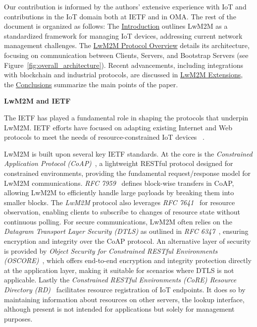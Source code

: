 \documentclass[11pt,sigconf]{iabart}
\begin{document}
Our contribution is informed by the authors' extensive experience with IoT and contributions in the IoT domain both at IETF and in OMA. The rest of the document is organized as follows: The \hyperref[introduction]{Introduction} outlines LwM2M as a standardized framework for managing IoT devices, addressing current network management challenges. The \hyperref[overview]{LwM2M Protocol Overview} details its architecture, focusing on communication between Clients, Servers, and Bootstrap Servers (see Figure~\ref{fig:overall_architecture}). Recent advancements, including integrations with blockchain and industrial protocols, are discussed in \hyperref[extensions]{LwM2M Extensions}, the \hyperref[conclusions]{Conclusions} summarize the main points of the paper.

\textbf{LwM2M and IETF}

The IETF has played a fundamental role in shaping the protocols that underpin LwM2M. IETF efforts have focused on adapting existing Internet and Web protocols to meet the needs of resource-constrained IoT devices ~\cite{9139045}.

LwM2M is built upon several key IETF standards. At the core is the \textit{Constrained Application Protocol (CoAP)}~\cite{rfc7252}, a lightweight RESTful protocol designed for constrained environments, providing the fundamental request/response model for LwM2M communications. \textit{RFC 7959}~\cite{rfc7959} defines block-wise transfers in CoAP, allowing LwM2M to efficiently handle large payloads by breaking them into smaller blocks. The \textit{LwM2M} protocol also leverages \textit{RFC 7641}~\cite{rfc7641} for resource observation, enabling clients to subscribe to changes of resource state without continuous polling. For secure communications, LwM2M often relies on the \textit{Datagram Transport Layer Security (DTLS)} as outlined in \textit{RFC 6347}~\cite{rfc6347}, ensuring encryption and integrity over the CoAP protocol. An alternative layer of security is provided by \textit{Object Security for Constrained RESTful Environments (OSCORE)}~\cite{rfc8613}, which offers end-to-end encryption and integrity protection directly at the application layer, making it suitable for scenarios where DTLS is not applicable. Lastly the \textit{Constrained RESTful Environments (CoRE) Resource Directory (RD)}~\cite{rfc9176} facilitates resource registration of IoT endpoints. It does so by maintaining information about resources on other servers, the lookup interface, although present is not intended for applications but solely for management purposes.
\sloppy
\end{document}
